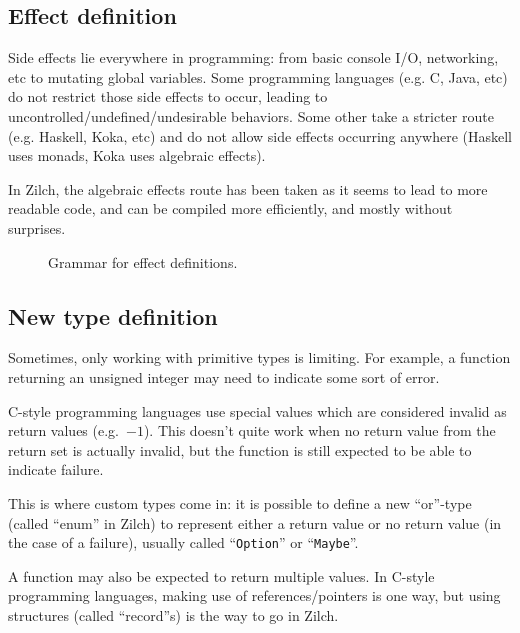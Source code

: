 \subsection{Effect definition}\label{subsec:zilch-grammar-declaration-effect}

Side effects lie everywhere in programming: from basic console I/O, networking, etc to mutating global variables.
Some programming languages (e.g. C, Java, etc) do not restrict those side effects to occur, leading to uncontrolled/undefined/undesirable behaviors.
Some other take a stricter route (e.g. Haskell, Koka, etc) and do not allow side effects occurring anywhere (Haskell uses monads, Koka uses algebraic effects).

In Zilch, the algebraic effects route has been taken as it seems to lead to more readable code, and can be compiled more efficiently, and mostly without surprises.

\begin{figure}[H]
	\centering


	\caption{Grammar for effect definitions.}
	\label{fig:zilch-grammar-declarations-effects-grammar}
\end{figure}

\subsection{New type definition}\label{subsec:zilch-grammar-declarations-type}

Sometimes, only working with primitive types is limiting.
For example, a function returning an unsigned integer may need to indicate some sort of error.

\noindent C-style programming languages use special values which are considered invalid as return values (e.g.\ $-1$).
This doesn't quite work when no return value from the return set is actually invalid, but the function is still expected to be able to indicate failure.

\noindent This is where custom types come in: it is possible to define a new ``or''-type (called ``enum'' in Zilch) to represent either a return value or no return value (in the case of a failure), usually called ``\texttt{Option}'' or ``\texttt{Maybe}''.

A function may also be expected to return multiple values.
In C-style programming languages, making use of references/pointers is one way, but using structures (called ``record''s) is the way to go in Zilch.

